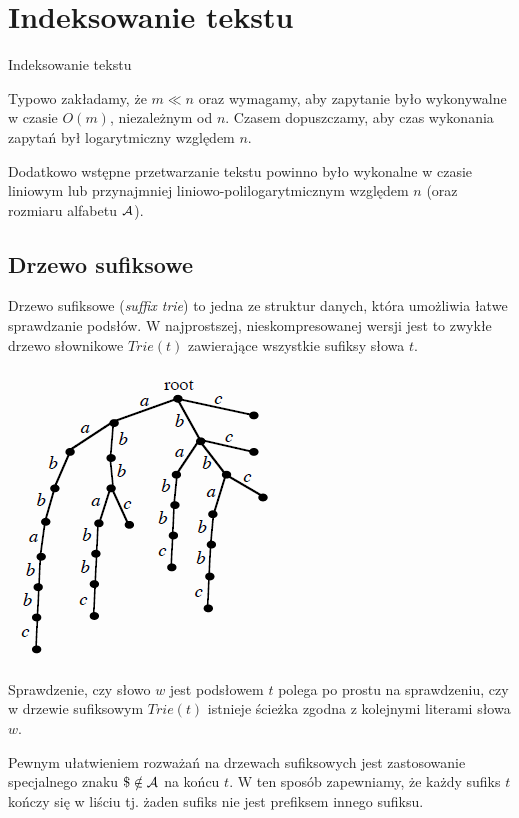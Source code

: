 \section{Indeksowanie tekstu}

\begin{algorithm}[H]
    \caption{Indeksowanie tekstu}
\end{algorithm}

Typowo zakładamy, że $m \ll n$ oraz wymagamy, aby zapytanie było wykonywalne w czasie $O(m)$, niezależnym od $n$. Czasem dopuszczamy, aby czas wykonania zapytań był logarytmiczny względem $n$.

Dodatkowo wstępne przetwarzanie tekstu powinno było wykonalne w czasie liniowym lub przynajmniej liniowo-polilogarytmicznym względem $n$ (oraz rozmiaru alfabetu $\operatorname{\mathcal{A}}$).

\subsection{Drzewo sufiksowe}

Drzewo sufiksowe (\emph{suffix trie}) to jedna ze struktur danych, która umożliwia łatwe sprawdzanie podsłów. W najprostszej, nieskompresowanej wersji jest to zwykłe drzewo słownikowe $Trie(t)$ zawierające wszystkie sufiksy słowa $t$.

\begin{center}
\includegraphics[width=0.45\linewidth]{graphics/suffix-trie-example.png}
\end{center}

Sprawdzenie, czy słowo $w$ jest podsłowem $t$ polega po prostu na sprawdzeniu, czy w drzewie sufiksowym $Trie(t)$ istnieje ścieżka zgodna z kolejnymi literami słowa $w$.

Pewnym ułatwieniem rozważań na drzewach sufiksowych jest zastosowanie specjalnego znaku $\$ \notin \operatorname{\mathcal{A}}$ na końcu $t$. W ten sposób zapewniamy, że każdy sufiks $t$ kończy się w liściu tj. żaden sufiks nie jest prefiksem innego sufiksu.

